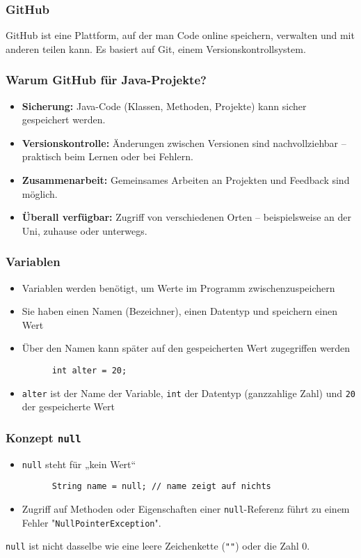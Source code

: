 \documentclass{../../presentation}
\begin{document}
\begin{frame}
  \frametitle{GitHub}
  GitHub ist eine Plattform, auf der man Code online speichern, verwalten und mit anderen teilen kann. Es basiert auf Git, einem Versionskontrollsystem.
\end{frame}

\begin{frame}
  \frametitle{Warum GitHub für Java-Projekte?}
  \pause
  \begin{itemize}
    \item \textbf{Sicherung:} Java-Code (Klassen, Methoden, Projekte) kann sicher gespeichert werden.
          \pause
    \item \textbf{Versionskontrolle:} Änderungen zwischen Versionen sind nachvollziehbar – praktisch beim Lernen oder bei Fehlern.
          \pause
    \item \textbf{Zusammenarbeit:} Gemeinsames Arbeiten an Projekten und Feedback sind möglich.
          \pause
    \item \textbf{Überall verfügbar:} Zugriff von verschiedenen Orten – beispielsweise an der Uni, zuhause oder unterwegs.
  \end{itemize}
\end{frame}

\begin{frame}[fragile]
  \frametitle{Variablen}
  \pause
  \begin{itemize}
    \item Variablen werden benötigt, um Werte im Programm zwischenzuspeichern
          \pause
    \item Sie haben einen Namen (Bezeichner), einen Datentyp und speichern einen Wert
          \pause
    \item Über den Namen kann später auf den gespeicherten Wert zugegriffen werden
          \pause
          \begin{verbatim}
      int alter = 20;
    \end{verbatim}
    \item \texttt{alter} ist der Name der Variable, \texttt{int} der Datentyp (ganzzahlige Zahl) und \texttt{20} der gespeicherte Wert
  \end{itemize}
\end{frame}

\begin{frame}[fragile]
  \frametitle{Konzept \texttt{null}}
  \pause
  \begin{itemize}
    \item \texttt{null} steht für „kein Wert“
          \begin{verbatim}
      String name = null; // name zeigt auf nichts
      \end{verbatim}
          \pause
    \item Zugriff auf Methoden oder Eigenschaften einer \texttt{null}-Referenz führt zu einem Fehler "\color{red}\texttt{NullPointerException}\color{black}".
  \end{itemize}
  \pause
  \achtung{} \texttt{null} ist nicht dasselbe wie eine leere Zeichenkette (\texttt{""}) oder die Zahl 0.
\end{frame}
\end{document}
